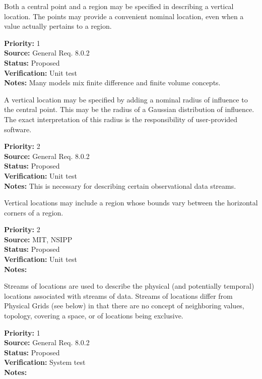 
  Both a central point and a region may be specified in describing a vertical
location.  The points may provide a convenient nominal location, even when
a value actually pertains to a region.
\begin{reqlist}
{\bf Priority:} 1 \\
{\bf Source:} General Req. 8.0.2 \\
{\bf Status:} Proposed \\
{\bf Verification:} Unit test\\
{\bf Notes:} Many models mix finite difference and finite volume concepts.
\end{reqlist}


  A vertical location may be specified by adding a nominal radius of
influence to the central point.  This may be the radius of a Gaussian
distribution of influence. The exact interpretation of this radius is
the responsibility of user-provided software.
\begin{reqlist}
{\bf Priority:} 2 \\
{\bf Source:} General Req. 8.0.2 \\
{\bf Status:} Proposed \\
{\bf Verification:} Unit test\\
{\bf Notes:} This is necessary for describing certain observational data streams.
\end{reqlist}


  Vertical locations may include a region whose bounds vary between the
horizontal corners of a region.
\begin{reqlist}
{\bf Priority:} 2 \\
{\bf Source:} MIT, NSIPP \\
{\bf Status:} Proposed \\
{\bf Verification:} Unit test\\
{\bf Notes:} 
\end{reqlist}


Streams of locations are used to describe the physical (and potentially temporal)
locations associated with streams of data.  Streams of locations differ from
Physical Grids (see below) in that there are no concept of neighboring values,
topology, covering a space, or of locations being exclusive.
\begin{reqlist}
{\bf Priority:} 1 \\
{\bf Source:} General Req. 8.0.2 \\
{\bf Status:} Proposed \\
{\bf Verification:} System test\\
{\bf Notes:} 
\end{reqlist}

